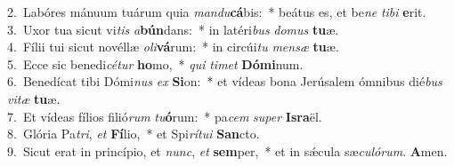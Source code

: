 {2.~}Labóres mánuum tuárum quia \textit{man}\textit{du}\textbf{cá}bis:~* beátus es, et be\textit{ne} \textit{ti}\textit{bi} \textbf{e}rit.\\
{3.~}Uxor tua sicut vi\textit{tis} \textit{a}\textbf{bún}dans:~* in latéri\textit{bus} \textit{do}\textit{mus} \textbf{tu}æ.\\
{4.~}Fílii tui sicut novéllæ \textit{o}\textit{li}\textbf{vá}rum:~* in circúi\textit{tu} \textit{men}\textit{sæ} \textbf{tu}æ.\\
{5.~}Ecce sic benedi\textit{cé}\textit{tur} \textbf{ho}mo,~* \textit{qui} \textit{ti}\textit{met} \textbf{Dó}\textbf{mi}num.\\
{6.~}Benedícat tibi Dómi\textit{nus} \textit{ex} \textbf{Si}on:~* et vídeas bona Jerúsalem ómnibus dié\textit{bus} \textit{vi}\textit{tæ} \textbf{tu}æ.\\
{7.~}Et vídeas fílios filió\textit{rum} \textit{tu}\textbf{ó}rum:~* pa\textit{cem} \textit{su}\textit{per} \textbf{Is}\textbf{ra}ël.\\
{8.~}Glória Pa\textit{tri}, \textit{et} \textbf{Fí}lio,~* et Spi\textit{rí}\textit{tu}\textit{i} \textbf{San}cto.\\
{9.~}Sicut erat in princípio, et \textit{nunc}, \textit{et} \textbf{sem}per,~* et in sǽcula sæ\textit{cu}\textit{ló}\textit{rum}. \textbf{A}men.\\
